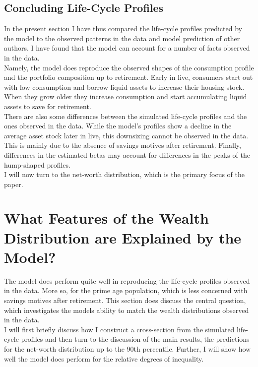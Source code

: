 \documentclass[a4paper,12pt,legno]{article}
\begin{document}
\subsection{Concluding Life-Cycle Profiles}
In the present section I have thus compared the life-cycle profiles predicted by the model to the observed patterns in the data and model prediction of other authors. I have found that the model can account for a number of facts observed in the data. \\ Namely, the model does reproduce the observed shapes of the consumption profile and the portfolio composition up to retirement. Early in live, consumers start out with low consumption and borrow liquid assets to increase their housing stock. When they grow older they increase consumption and start accumulating liquid assets to save for retirement. \\
There are also some differences between the simulated life-cycle profiles and the ones observed in the data. While the model's profiles show a decline in the average asset stock later in live, this downsizing cannot be observed in the data. This is mainly due to the absence of savings motives after retirement. Finally, differences in the estimated betas may account for differences in the peaks of the hump-shaped profiles.\\ 
I will now turn to the net-worth distribution, which is the primary focus of the paper. 

\section{What Features of the Wealth Distribution are Explained by the Model?}
\label{Chapter5}
The model does perform quite well in reproducing the life-cycle profiles observed in the data. More so, for the prime age population, which is less concerned with savings motives after retirement. This section does discuss the central question, which investigates the models ability to match the wealth distributions observed in the data.\\
I will first briefly discuss how I construct a cross-section from the simulated life-cycle profiles and then turn to the discussion of the main results, the predictions for the net-worth distribution up to the 90th percentile. Further, I will show how well the model does perform for the relative degrees of inequality. 
\end{document}
